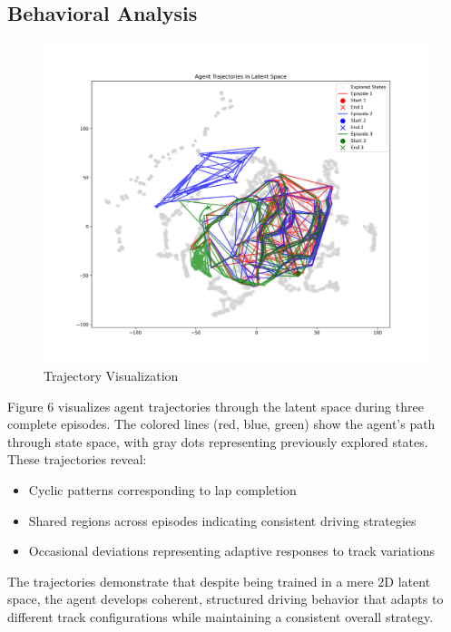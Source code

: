 \documentclass[conference]{IEEEtran}
\begin{document}
\subsection{Behavioral Analysis}
\begin{figure}[H]
    \centering
    \includegraphics[width=0.75\linewidth]{Writeup/train-visualization.png}
    \caption{Trajectory Visualization}
    \label{fig:enter-label}
\end{figure}
Figure 6 visualizes agent trajectories through the latent space during three complete episodes. The colored lines (red, blue, green) show the agent's path through state space, with gray dots representing previously explored states. These trajectories reveal:
\begin{itemize}
    \item Cyclic patterns corresponding to lap completion
    \item Shared regions across episodes indicating consistent driving strategies
    \item Occasional deviations representing adaptive responses to track variations
\end{itemize}

The trajectories demonstrate that despite being trained in a mere 2D latent space, the agent develops coherent, structured driving behavior that adapts to different track configurations while maintaining a consistent overall strategy.
\end{document}

